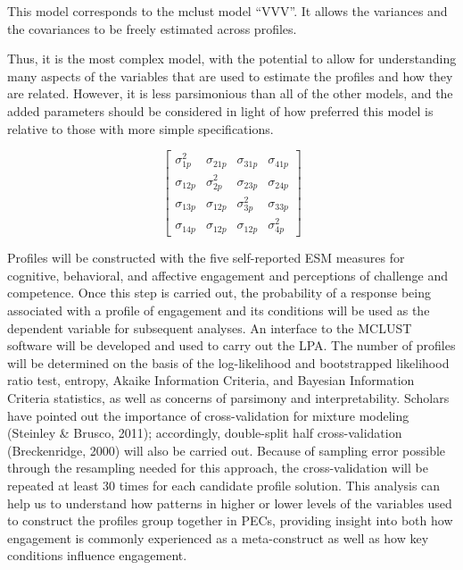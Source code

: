 \documentclass[]{msu-thesis}
\theoremstyle{definition}
\theoremstyle{definition}
\theoremstyle{definition}
\theoremstyle{remark}
\begin{document}
This model corresponds to the mclust model ``VVV''. It allows the
variances and the covariances to be freely estimated across profiles.

Thus, it is the most complex model, with the potential to allow for
understanding many aspects of the variables that are used to estimate
the profiles and how they are related. However, it is less parsimonious
than all of the other models, and the added parameters should be
considered in light of how preferred this model is relative to those
with more simple specifications.

\[
\left[ \begin{matrix} { \sigma  }_{ 1p }^{ 2 } & { \sigma  }_{ 21p } & { \sigma  }_{ 31p } & { \sigma  }_{ 41p } \\ { \sigma  }_{ 12p } & { \sigma  }_{ 2p }^{ 2 } & { \sigma  }_{ 23p } & { \sigma  }_{ 24p } \\ { \sigma  }_{ 13p } & { \sigma  }_{ 12p } & { \sigma  }_{ 3p }^{ 2 } & { \sigma  }_{ 33p } \\ { \sigma  }_{ 14p } & { \sigma  }_{ 12p } & { \sigma  }_{ 12p } & { \sigma  }_{ 4p }^{ 2 } \end{matrix} \right] 
\]

Profiles will be constructed with the five self-reported ESM measures
for cognitive, behavioral, and affective engagement and perceptions of
challenge and competence. Once this step is carried out, the probability
of a response being associated with a profile of engagement and its
conditions will be used as the dependent variable for subsequent
analyses. An interface to the MCLUST software will be developed and used
to carry out the LPA. The number of profiles will be determined on the
basis of the log-likelihood and bootstrapped likelihood ratio test,
entropy, Akaike Information Criteria, and Bayesian Information Criteria
statistics, as well as concerns of parsimony and interpretability.
Scholars have pointed out the importance of cross-validation for mixture
modeling (Steinley \& Brusco, 2011); accordingly, double-split half
cross-validation (Breckenridge, 2000) will also be carried out. Because
of sampling error possible through the resampling needed for this
approach, the cross-validation will be repeated at least 30 times for
each candidate profile solution. This analysis can help us to understand
how patterns in higher or lower levels of the variables used to
construct the profiles group together in PECs, providing insight into
both how engagement is commonly experienced as a meta-construct as well
as how key conditions influence engagement.
\end{document}
